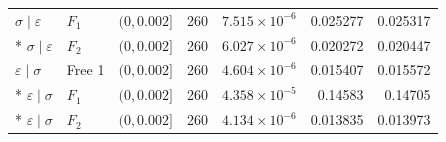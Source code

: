 \begin{longtable}{lllrrrr}
$\sigma\mid \varepsilon$ & $F_1$ & $(0,0.002]$ & 260 & $7.515\!\times\!10^{-6}$ & 0.025277 & 0.025317\\*
$\sigma\mid \varepsilon$ & $F_2$ & $(0,0.002]$ & 260 & $6.027\!\times\!10^{-6}$ & 0.020272 & 0.020447\\
\midrule
$\varepsilon\mid \sigma$ & Free 1 & $(0,0.002]$ & 260 & $4.604\!\times\!10^{-6}$ & 0.015407 & 0.015572\\*
$\varepsilon\mid \sigma$ & $F_1$ & $(0,0.002]$ & 260 & $4.358\!\times\!10^{-5}$ & 0.14583 & 0.14705\\*
$\varepsilon\mid \sigma$ & $F_2$ & $(0,0.002]$ & 260 & $4.134\!\times\!10^{-6}$ & 0.013835 & 0.013973\\
\end{longtable}
\endgroup
